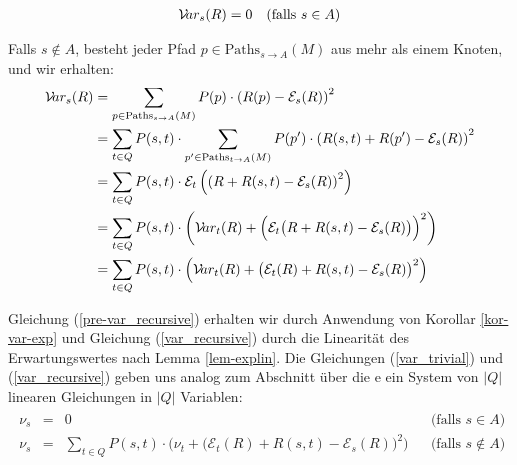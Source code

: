 \documentclass[a4paper]{article}
\theoremstyle{nonumberplain}
\begin{document}
\begin{align}
\mathcal{V}\!ar_{s}(R) = 0 && \text{(falls $s \in A$)}\label{var_trivial}
\end{align}

Falls $s \notin A$, besteht jeder Pfad $p \in \mathrm{Paths}_{s \rightarrow A}(M)$ aus mehr als einem Knoten, und wir erhalten:
\begin{align}
\mathcal{V}\!ar_{s}(R) & = \sum_{p \in \mathrm{Paths}_{s \rightarrow A}(M)}{P(p) \cdot \left(R(p) - \mathcal{E}_{s}(R)\right)^2} \\
& = \sum_{t \in Q}{ P(s,t) \cdot \sum_{p' \in \mathrm{Paths}_{t \rightarrow A}(M)}{ P(p') \cdot \left(R(s,t) + R(p') - \mathcal{E}_{s}(R)\right)^2 } } \\
& = \sum_{t \in Q}{ P(s,t) \cdot \mathcal{E}_{t}\left(\left(R + R(s,t) - \mathcal{E}_{s}(R)\right)^2\right) } \\
& = \sum_{t \in Q}{ P(s,t) \cdot \bigg(\mathcal{V}\!ar_{t}(R) + \Big(\mathcal{E}_{t}\big(R + R(s,t) - \mathcal{E}_{s}(R)\big)\Big)^2\bigg) } \label{pre-var_recursive} \\
& = \sum_{t \in Q}{ P(s,t) \cdot \Big(\mathcal{V}\!ar_{t}(R) + \big(\mathcal{E}_{t}(R) + R(s,t) - \mathcal{E}_{s}(R)\big)^2\Big) } \label{var_recursive}
\end{align}

Gleichung (\ref{pre-var_recursive}) erhalten wir durch Anwendung von Korollar \ref{kor-var-exp} und Gleichung (\ref{var_recursive}) durch die Linearität des Erwartungswertes nach Lemma \ref{lem-explin}.
Die Gleichungen (\ref{var_trivial}) und (\ref{var_recursive}) geben uns analog zum Abschnitt über die \expect{}e ein System von $|Q|$ linearen Gleichungen in $|Q|$ Variablen:
\begin{align}
\begin{aligned}
	\nu_s & = & 0 && \text{(falls $s \in A$)}\\
	\nu_s & = & \sum_{t \in Q}{ P(s,t) \cdot \Big(\nu_t + \big(\mathcal{E}_{t}(R) + R(s,t) - \mathcal{E}_{s}(R)\big)^2\Big) } && \text{(falls $s \notin A$)}
\end{aligned}\label{les-var}
\end{align}
\end{document}
